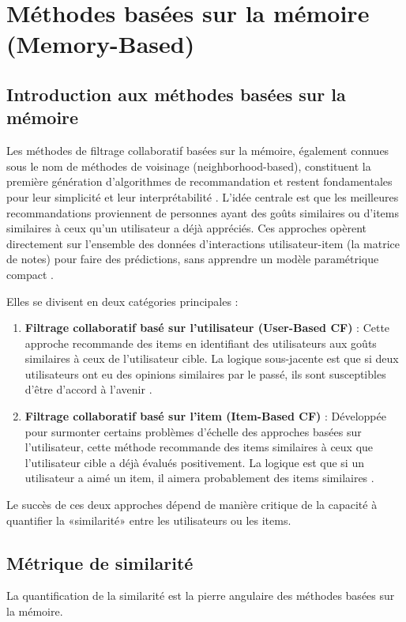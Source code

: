\section{Méthodes basées sur la mémoire (Memory-Based)}

\subsection{Introduction aux méthodes basées sur la mémoire}
Les méthodes de filtrage collaboratif basées sur la mémoire, également connues sous le nom de méthodes de voisinage (neighborhood-based), constituent la première génération d'algorithmes de recommandation et restent fondamentales pour leur simplicité et leur interprétabilité \citep{Adomavicius2005}. L'idée centrale est que les meilleures recommandations proviennent de personnes ayant des goûts similaires ou d'items similaires à ceux qu'un utilisateur a déjà appréciés. Ces approches opèrent directement sur l'ensemble des données d'interactions utilisateur-item (la matrice de notes) pour faire des prédictions, sans apprendre un modèle paramétrique compact \citep{Ricci2011}.

Elles se divisent en deux catégories principales :
\begin{enumerate}
    \item \textbf{Filtrage collaboratif basé sur l'utilisateur (User-Based CF)} : Cette approche recommande des items en identifiant des utilisateurs aux goûts similaires à ceux de l'utilisateur cible. La logique sous-jacente est que si deux utilisateurs ont eu des opinions similaires par le passé, ils sont susceptibles d'être d'accord à l'avenir \citep{Adomavicius2005}.
    \item \textbf{Filtrage collaboratif basé sur l'item (Item-Based CF)} : Développée pour surmonter certains problèmes d'échelle des approches basées sur l'utilisateur, cette méthode recommande des items similaires à ceux que l'utilisateur cible a déjà évalués positivement. La logique est que si un utilisateur a aimé un item, il aimera probablement des items similaires \citep{Sarwar2001}.
\end{enumerate}
Le succès de ces deux approches dépend de manière critique de la capacité à quantifier la «similarité» entre les utilisateurs ou les items.

\subsection{Métrique de similarité}
La quantification de la similarité est la pierre angulaire des méthodes basées sur la mémoire.

